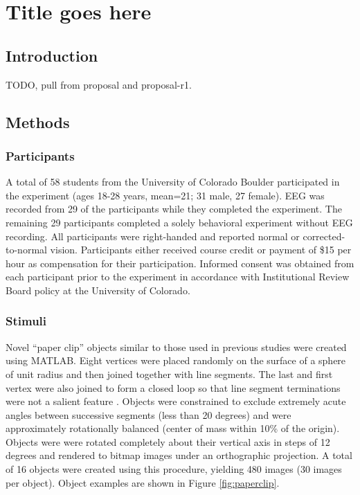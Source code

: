 \documentclass[dwyatte_dissertation.tex]{subfiles}
\begin{document}
\chapter{Title goes here} %

\section{Introduction}
TODO, pull from proposal and proposal-r1.

\section{Methods}

\subsection{Participants}

A total of 58 students from the University of Colorado Boulder participated in the experiment (ages 18-28 years, mean=21; 31 male, 27 female). EEG was recorded from 29 of the participants while they completed the experiment. The remaining 29 participants completed a solely behavioral experiment without EEG recording. All participants were right-handed and reported normal or corrected-to-normal vision. Participants either received course credit or payment of \$15 per hour as compensation for their participation. Informed consent was obtained from each participant prior to the experiment in accordance with Institutional Review Board policy at the University of Colorado.

\subsection{Stimuli}
Novel ``paper clip'' objects similar to those used in previous studies \cite{BulthoffEdelman92,EdelmanBulthoff92,LogothetisPaulsBulthoffEtAl94,LogothetisPaulsPoggio95,SinhaPoggio96} were created using MATLAB. Eight vertices were placed randomly on the surface of a sphere of unit radius and then joined together with line segments. The last and first vertex were also joined to form a closed loop so that line segment terminations were not a salient feature \cite{BalasSinha09b}. Objects were constrained to exclude extremely acute angles between successive segments (less than 20 degrees) and were approximately rotationally balanced (center of mass within 10\% of the origin). Objects were were rotated completely about their vertical axis in steps of 12 degrees and rendered to bitmap images under an orthographic projection. A total of 16 objects were created using this procedure, yielding 480 images (30 images per object). Object examples are shown in Figure \ref{fig:paperclip}.
\end{document}

